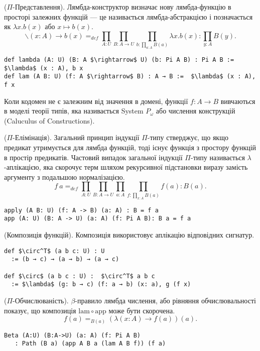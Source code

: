 \begin{definition} ($\Pi$-Представлення). Лямбда-конструктор визначає
нову лямбда-функцію в просторі залежних функцій — це називається
лямбда-абстракцією і позначається як $\lambda x. b(x)$ або $x \mapsto b(x)$.
$$\backslash (x: A) \rightarrow b(x) =_{def} \prod_{A:U}\prod_{B:A \rightarrow U}\prod_{b:\prod_{a:A}B(a)}\lambda x.b(x) : \prod_{y:A}B(y).$$
\begin{lstlisting}
def lambda (A: U) (B: A $\rightarrow$ U) (b: Pi A B) : Pi A B := $\lambda$ (x : A), b x
def lam (A B: U) (f: A $\rightarrow$ B) : A → B :=  $\lambda$ (x : A), f x
\end{lstlisting}
\end{definition}
Коли кодомен не є залежним від значення в домені, функції $f: A \rightarrow B$ вивчаються в моделі теорії типів,
яка називається System $P_\omega$ або числення конструкцій (Caluculus of Constructions).

\newpage
\begin{definition} ($\Pi$-Елімінація). Загальний принцип індукції $\Pi$-типу стверджує, що якщо предикат утримується
для лямбда функцій, тоді існує функція з простору функцій в простір предикатів. Частовий випадок загальної індукції
$\Pi$-типу називається $\lambda$-аплікацією, яка скорочує терм шляхом рекурсивної підстановки виразу замість аргументу з
подальшою нормалізацією.
$$f\ a =_{def} \prod_{A:U}\prod_{B: A \rightarrow U}\prod_{a:A}\prod_{f: \prod_{x:A}B(a)}f(a) : B(a).$$
\begin{lstlisting}
apply (A B: U) (f: A -> B) (a: A) : B = f a
app (A: U) (B: A -> U) (a: A) (f: Pi A B): B a = f a
\end{lstlisting}
\end{definition}

\begin{definition} (Композиція функцій). Композиція використовує аплікацію відповідних сигнатур.
\begin{lstlisting}
def $\circ^T$ (a b c: U) : U
  := (b → c) → (a → b) → (a → c)

def $\circ$ (a b c : U) :  $\circ^T$ a b c
  := $\lambda$ (g: b → c) (f: a → b) (x: a), g (f x)
\end{lstlisting}
\end{definition}

\newpage
\begin{theorem} ($\Pi$-Обчислюваність). $\beta$-правило лямбда числення, або рівняння
обчислювальності показує, що композиція $\mathrm{lam} \circ \mathrm{app}$ може бути скорочена.
$$f(a) =_{B(a)} (\lambda (x:A) \rightarrow f(a))(a).$$
\begin{lstlisting}
Beta (A:U) (B:A->U) (a: A) (f: Pi A B)
   : Path (B a) (app A B a (lam A B f)) (f a)
\end{lstlisting}
\end{theorem}

